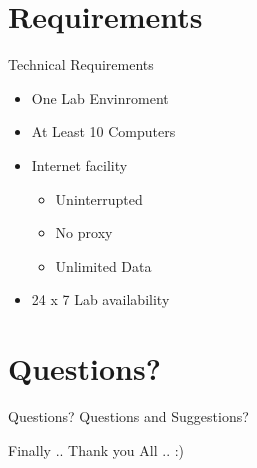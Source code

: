 \documentclass[xcolor=dvipsnames]{beamer}
\begin{document}
\section{Requirements}
\begin{frame}{Technical Requirements}
\begin{itemize}
	\item One Lab Envinroment
	\item At Least 10 Computers
	\item Internet facility
		\begin{itemize}
			\item Uninterrupted
			\item No proxy 
			\item Unlimited Data
		\end{itemize}
	\item 24 x 7 Lab availability
\end{itemize}
\end{frame}

\section{Questions?}
\begin{frame}{Questions?}
\centering
Questions and Suggestions? 
\end{frame}


\begin{frame}{Finally ..}
Thank you All .. :)
\end{frame}
\end{document}
